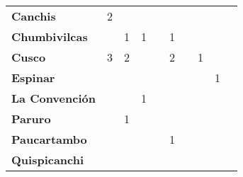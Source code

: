\begin{tabular}{lccccccccc}
	\textbf{Canchis}                            
	&2         									&\cellcolor[HTML]{FCC46C}                	&\cellcolor[HTML]{FCC46C}              		&\cellcolor[HTML]{FCC46C} 		  			&\cellcolor[HTML]{FCC46C} 
	&\cellcolor[HTML]{FCC46C}   				&\cellcolor[HTML]{FCC46C} 							&\cellcolor[HTML]{FCC46C}					&\cellcolor[HTML]{FCC46C}\\
	\textbf{Chumbivilcas}                      
	&\cellcolor[HTML]{FCC46C}                   &1                  &1                  						&\cellcolor[HTML]{FCC46C}       &1
	&\cellcolor[HTML]{FCC46C}   			    &\cellcolor[HTML]{FCC46C}
	&\cellcolor[HTML]{FCC46C}					&\cellcolor[HTML]{FCC46C}\\
	\textbf{Cusco}                             
	&3                    			&2                  
	&\cellcolor[HTML]{FCC46C}                   &\cellcolor[HTML]{FCC46C}    	 
	&2 											&\cellcolor[HTML]{FCC46C} 		 
	&1											&\cellcolor[HTML]{FCC46C}
	&\cellcolor[HTML]{FCC46C}\\
	\textbf{Espinar}       					                 						   
	&\cellcolor[HTML]{FCC46C}        			&\cellcolor[HTML]{FCC46C}                   &\cellcolor[HTML]{FCC46C}                   &\cellcolor[HTML]{FCC46C}  		 			&\cellcolor[HTML]{FCC46C} 
	&\cellcolor[HTML]{FCC46C} 					&\cellcolor[HTML]{FCC46C} 		 
	&1											&\cellcolor[HTML]{FCC46C}\\
	\textbf{La Convención}                                    &\cellcolor[HTML]{FCC46C}                   &\cellcolor[HTML]{FCC46C}                   &1                   						&\cellcolor[HTML]{FCC46C}              		&\cellcolor[HTML]{FCC46C} 					&\cellcolor[HTML]{FCC46C}
	&\cellcolor[HTML]{FCC46C}  					&\cellcolor[HTML]{FCC46C} 		
	&\cellcolor[HTML]{FCC46C}\\
	\textbf{Paruro}                            
	&\cellcolor[HTML]{FCC46C}              	    &1                   &\cellcolor[HTML]{FCC46C}              	    &\cellcolor[HTML]{FCC46C}        
	&\cellcolor[HTML]{FCC46C}                   &\cellcolor[HTML]{FCC46C}   				
	&\cellcolor[HTML]{FCC46C} 					&\cellcolor[HTML]{FCC46C}		 \\
	\textbf{Paucartambo}               		    &\cellcolor[HTML]{FCC46C}                     
	&\cellcolor[HTML]{FCC46C}       &\cellcolor[HTML]{FCC46C}                      
	&\cellcolor[HTML]{FCC46C}                   &1
	&\cellcolor[HTML]{FCC46C} 					&\cellcolor[HTML]{FCC46C}		&\cellcolor[HTML]{FCC46C}					&\cellcolor[HTML]{FCC46C}\\
	\textbf{Quispicanchi}                                         

\end{tabular}
